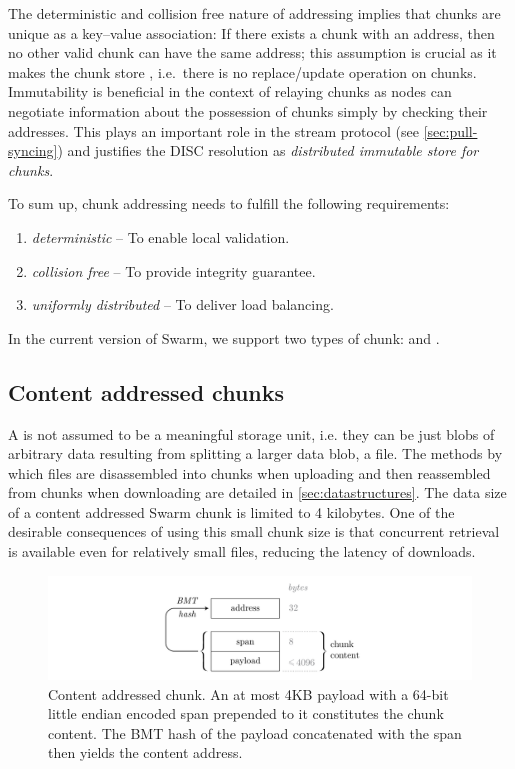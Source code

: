 The deterministic and collision free nature of addressing implies that chunks are unique as a key--value association: If there exists a chunk with an address, then no other valid chunk can have the same address; this assumption is crucial as it makes the chunk store , i.e.\ there is no replace/update operation on chunks. Immutability is beneficial in the context of relaying chunks as nodes can negotiate information about the possession of chunks simply by checking their addresses. This plays an important role in the stream protocol (see \ref{sec:pull-syncing}) and justifies the DISC resolution as \emph{distributed immutable store for chunks}.

To sum up, chunk addressing needs to fulfill the following requirements:

\begin{enumerate}
    \item \emph{deterministic} -- To enable local validation.
    \item \emph{collision free} -- To provide integrity guarantee.
    \item \emph{uniformly distributed} -- To deliver load balancing.
\end{enumerate}

In the current version of Swarm, we support two types of chunk:  and . 

\subsection{Content addressed  chunks\statusgreen}\label{sec:content-addressed-chunks}

A  is not assumed to be a meaningful storage unit, i.e. they can be just blobs of arbitrary data resulting from splitting a larger data blob, a file. The methods by which files are disassembled into chunks when uploading and then reassembled from chunks when downloading are detailed in \ref{sec:datastructures}. The data size of a content addressed Swarm chunk is limited to 4 kilobytes. One of the desirable consequences of using this small chunk size is that concurrent retrieval is available even for relatively small files, reducing the latency of downloads. 

\begin{figure}[htbp]
   \centering
   \includegraphics[width=\textwidth]{fig/content-addressed-chunk-3.pdf}
   \caption[Content addressed chunk\statusgreen]{Content addressed chunk. An at most 4KB payload with a 64-bit little endian encoded span prepended to it constitutes the chunk content. The BMT hash of the payload concatenated with the span then yields the content address.}
   \label{fig:content-addressed-chunk}
\end{figure}

